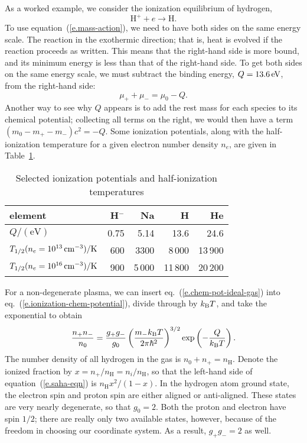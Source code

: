 As a worked example, we consider the ionization equilibrium of hydrogen,
\[ \mathrm{H^{+}} + e \to \mathrm{H}. \]
To use equation~(\ref{e.mass-action}), we need to have both sides on the same energy scale. The reaction in the exothermic direction; that is, heat is evolved if the reaction proceeds as written.  This means that the right-hand side is more bound, and its minimum energy is less than that of the right-hand side. To get both sides on the same energy scale, we must subtract the binding energy, $Q=13.6\,\mathrm{eV}$, from the right-hand side:
\begin{equation}\label{e.ionization-chem-potential}
\mu_{+} + \mu_{-}= \mu_{0} -  Q.
\end{equation}
Another way to see why $Q$ appears is to add the rest mass for each species to its chemical potential; collecting all terms on the right, we would then have a term $(m_{0}-m_{+}-m_{-})c^{2} = -Q$. Some ionization potentials, along with the half-ionization temperature for a given electron number density $n_{e}$, are given in Table~\ref{t.ionization-potentials}.

\begin{table}[htpb]
\begin{center}
\caption{Selected ionization potentials and half-ionization temperatures}\label{t.ionization-potentials}
\begin{tabular}{l|rrrr}
\hline
element & H$^{-}$ & Na & H & He\\
\hline\hline
$Q/(\mathrm{eV})$ & 0.75 & 5.14 & 13.6 & 24.6\\
$T_{1/2}(n_{e} = 10^{13}\,\mathrm{c}\mathrm{m}^{-3})/\mathrm{K}$ & 600 & 3300 & 8\,000 & 13\,900\\
$T_{1/2}(n_{e} = 10^{16}\,\mathrm{c}\mathrm{m}^{-3})/\mathrm{K}$ & 900 & 5\,000 & 11\,800 & 20\,200\\
\hline
\end{tabular}
\end{center}
\end{table}

For a non-degenerate plasma, we can insert eq.~(\ref{e.chem-pot-ideal-gas}) into eq.~(\ref{e.ionization-chem-potential}), divide through by $k_\mathrm{B} T$, and take the exponential to obtain
\begin{equation}\label{e.saha-eqn}
\frac{n_{+}n_{-}}{n_{0}} = \frac{g_{+}g_{-}}{g_{0}}\left(\frac{m_{-}k_\mathrm{B} T}{2\pi\hbar^{2}}\right)^{3/2}\exp\left(-\frac{Q}{k_\mathrm{B} T}\right).
\end{equation}
The number density of all hydrogen in the gas is $n_{0}+n_{+} = n_{\mathrm{H}}$.  Denote the ionized fraction by $x = n_{+}/n_{\mathrm{H}} = n_{i}/n_{\mathrm{H}}$, so that the left-hand side of equation~(\ref{e.saha-eqn}) is $n_{\mathrm{H}} x^{2}/(1-x)$. In the hydrogen atom ground state, the electron spin and proton spin are either aligned or anti-aligned. These states are very nearly degenerate, so that $g_{0} = 2$.  Both the proton and electron have spin $1/2$; there are really only two available states, however, because of the freedom in choosing our coordinate system.  As a result, $g_{+}g_{-} = 2$ as well.

